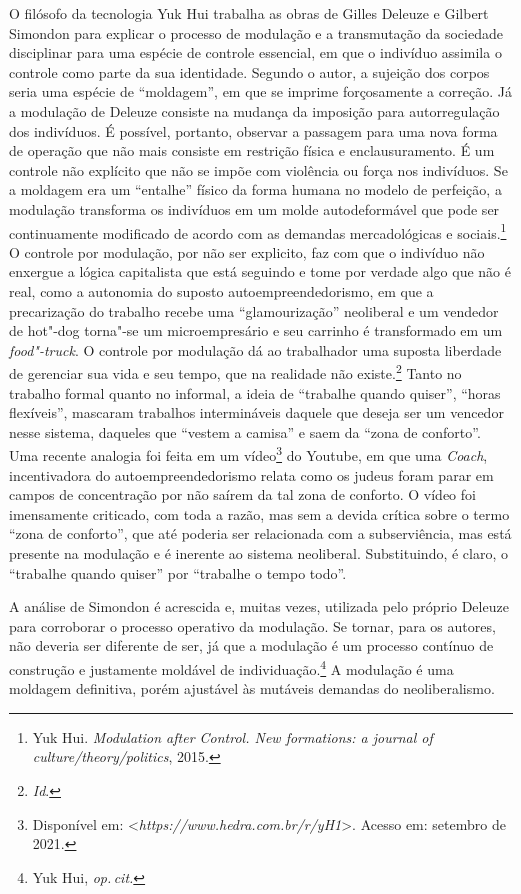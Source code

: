 O filósofo da tecnologia Yuk Hui trabalha as obras de Gilles
Deleuze e Gilbert Simondon para explicar o processo de modulação e a
transmutação da sociedade disciplinar para uma espécie de controle
essencial, em que o indivíduo assimila o controle como parte da sua
identidade. Segundo o autor, a sujeição dos corpos seria uma espécie de
``moldagem'', em que se imprime forçosamente a correção. Já a modulação
de Deleuze consiste na mudança da imposição para autorregulação dos
indivíduos. É possível, portanto, observar a passagem para uma nova
forma de operação que não mais consiste em restrição física e
enclausuramento. É um controle não explícito que não se impõe com
violência ou força nos indivíduos. Se a moldagem era um ``entalhe''
físico da forma humana no modelo de perfeição, a modulação transforma os
indivíduos em um molde autodeformável que pode ser continuamente
modificado de acordo com as demandas mercadológicas e sociais.\footnote{Yuk Hui. \emph{Modulation after Control. New formations: a journal of
culture/theory/politics}, 2015.}
O controle por modulação, por não ser explicito, faz com que o
indivíduo não enxergue a lógica capitalista que está seguindo e tome por
verdade algo que não é real, como a autonomia do suposto
autoempreendedorismo, em que a precarização do trabalho recebe uma
``glamourização'' neoliberal e um vendedor de hot"-dog torna"-se um
microempresário e seu carrinho é transformado em um \emph{food"-truck}. O
controle por modulação dá ao trabalhador uma suposta liberdade de
gerenciar sua vida e seu tempo, que na realidade não existe.\footnote{\textit{Id}.} Tanto no trabalho formal quanto no
informal, a ideia de ``trabalhe quando quiser'', ``horas
flexíveis'', mascaram trabalhos intermináveis daquele que deseja ser um
vencedor nesse sistema, daqueles que ``vestem a camisa'' e saem
da ``zona de conforto''. Uma recente analogia foi feita em um
vídeo\footnote{Disponível em: \textless{}\emph{https://www.hedra.com.br/r/yH1}\textgreater{}. Acesso em: setembro de 2021.} do Youtube, em que uma \emph{Coach},
incentivadora do autoempreendedorismo relata como os judeus foram parar
em campos de concentração por não saírem da tal zona de conforto. O
vídeo foi imensamente criticado, com toda a razão, mas sem a devida
crítica sobre o termo ``zona de conforto'', que até poderia ser
relacionada com a subserviência, mas está presente na modulação e é
inerente ao sistema neoliberal. Substituindo, é claro, o ``trabalhe
quando quiser'' por ``trabalhe o tempo todo''.

A análise de Simondon é acrescida e, muitas vezes, utilizada pelo
próprio Deleuze para corroborar o processo operativo da modulação. Se
tornar, para os autores, não deveria ser diferente de ser, já que a
modulação é um processo contínuo de construção e justamente moldável de
individuação.\footnote{Yuk Hui, \textit{op.\,cit.}} A modulação é uma moldagem definitiva,
porém ajustável às mutáveis demandas do neoliberalismo.

